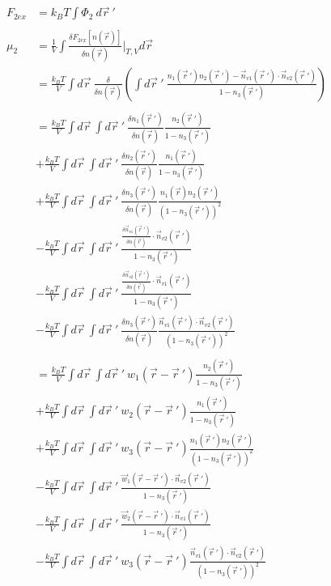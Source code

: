 \documentclass[double,12pt]{beavtex}
\begin{document}
\begin{align}
    F_{2ex} &= k_BT\int \Phi_2 ~d\vec r~' \\ \nonumber\\
    \mu_2 &= \frac{1}{V}\int \frac{\delta F_{2ex}[n(\vec r)]}{\delta 
          n(\vec r)}\bigg|_{T,V} d\vec{r} \\
%
          &= \frac{k_BT}{V} \int d\vec r ~\frac{\delta }{\delta n(\vec r)}
          \left(\int d \vec r~' ~\frac{n_1(\vec r~')n_2(\vec r~')-\vec n_{v1}
          (\vec r~')\cdot \vec n_{v2}(\vec r~')}{1-n_3(\vec r~')}\right) 
          \nonumber\\ \\        
%
          &= \frac{k_BT}{V} \int d\vec r~ \int d \vec r~' ~
          \frac{\delta n_1(\vec r~')}{\delta n(\vec r)}
          \frac{n_2(\vec r~')}{1-n_3(\vec r~')}   \nonumber\\
          &+\frac{k_BT}{V} \int d\vec r~ \int d \vec r~' ~
          \frac{\delta n_2(\vec r~')}{\delta n(\vec r)}
          \frac{n_1(\vec r~')}{1-n_3(\vec r~')}   \nonumber\\
          &+\frac{k_BT}{V} \int d\vec r~ \int d \vec r~'~
          \frac{\delta n_3(\vec r~')}{\delta n(\vec r)}
          \frac{n_1(\vec r)n_2(\vec r~')}{(1-n_3(\vec r~'))^2}  \nonumber\\
          &-\frac{k_BT}{V} \int d\vec r~ \int d \vec r~'~ \frac{\frac{\delta 
          \vec n_{v1}(\vec r~')}{\delta n(\vec r)}\cdot \vec n_{v2}(\vec r~')}
          {1-n_3(\vec r~')}  \nonumber\\
          &-\frac{k_BT}{V} \int d\vec r~ \int d \vec r~'~ \frac{\frac{\delta 
          \vec n_{v2}(\vec r~')}{\delta n(\vec r)}\cdot \vec n_{v1}(\vec r~')}
          {1-n_3(\vec r~')}  \nonumber\\
          &-\frac{k_BT}{V} \int d\vec r~\int d \vec r~'~
          \frac{\delta n_3(\vec r~')}{\delta n(\vec r)}
           \frac{\vec n_{v1}(\vec r~')\cdot \vec n_{v2}(\vec r~')}
           {(1-n_3(\vec r~'))^2} \\ \nonumber\\
%
          &= \frac{k_BT}{V} \int d\vec r~ \int d \vec r~' ~w_1(\vec r-\vec r~')
          \frac{n_2(\vec r~')}{1-n_3(\vec r~')}   \nonumber\\
          &+\frac{k_BT}{V} \int d\vec r~ \int d \vec r~' ~w_2(\vec r-\vec r~')
          \frac{n_1(\vec r~')}{1-n_3(\vec r~')}   \nonumber\\
          &+\frac{k_BT}{V} \int d\vec r~ \int d \vec r~'~w_3(\vec r - \vec r~') 
          \frac{n_1(\vec r~')n_2(\vec r~')}{(1-n_3(\vec r~'))^2}  \nonumber\\
          &-\frac{k_BT}{V} \int d\vec r~ \int d \vec r~' ~\frac{\vec w_1(\vec r 
          - \vec r~')\cdot \vec n_{v2}(\vec r~')}{1-n_3(\vec r~')}  \nonumber\\
          &-\frac{k_BT}{V} \int d\vec r~ \int d \vec r~'~ \frac{\vec w_2(\vec r 
          - \vec r~')\cdot \vec n_{v1}(\vec r~')}{1-n_3(\vec r~')}  \nonumber\\
          &-\frac{k_BT}{V} \int d\vec r~\int d \vec r~'~ w_3(\vec r - \vec r~')
           \frac{\vec n_{v1}(\vec r~')\cdot \vec n_{v2}(\vec r~')}
           {(1-n_3(\vec r~'))^2} 
\end{align}
\end{document}
